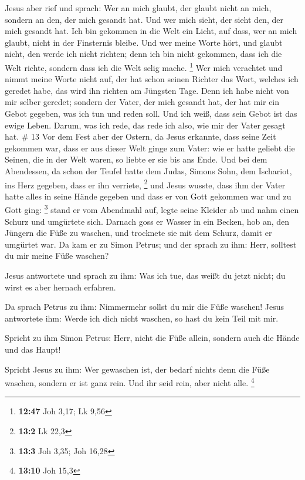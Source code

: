  Jesus aber rief und sprach: Wer an mich glaubt, der glaubt
nicht an mich, sondern an den, der mich gesandt hat.  Und
wer mich sieht, der sieht den, der mich gesandt hat.  Ich
bin gekommen in die Welt ein Licht, auf dass, wer an mich glaubt, nicht
in der Finsternis bleibe.  Und wer meine Worte hört, und
glaubt nicht, den werde ich nicht richten; denn ich bin nicht gekommen,
dass ich die Welt richte, sondern dass ich die Welt selig mache.
\footnote{\textbf{12:47} Joh 3,17; Lk 9,56}  Wer mich
verachtet und nimmt meine Worte nicht auf, der hat schon seinen Richter
das Wort, welches ich geredet habe, das wird ihn richten am Jüngsten
Tage.  Denn ich habe nicht von mir selber geredet; sondern
der Vater, der mich gesandt hat, der hat mir ein Gebot gegeben, was ich
tun und reden soll.  Und ich weiß, dass sein Gebot ist das
ewige Leben. Darum, was ich rede, das rede ich also, wie mir der Vater
gesagt hat. \# 13  Vor dem Fest aber der Ostern, da Jesus
erkannte, dass seine Zeit gekommen war, dass er aus dieser Welt ginge
zum Vater: wie er hatte geliebt die Seinen, die in der Welt waren, so
liebte er sie bis ans Ende.  Und bei dem Abendessen, da
schon der Teufel hatte dem Judas, Simons Sohn, dem Ischariot, ins Herz
gegeben, dass er ihn verriete, \footnote{\textbf{13:2} Lk 22,3}
 und Jesus wusste, dass ihm der Vater hatte alles in seine
Hände gegeben und dass er von Gott gekommen war und zu Gott ging:
\footnote{\textbf{13:3} Joh 3,35; Joh 16,28}  stand er vom
Abendmahl auf, legte seine Kleider ab und nahm einen Schurz und
umgürtete sich.  Darnach goss er Wasser in ein Becken, hob
an, den Jüngern die Füße zu waschen, und trocknete sie mit dem Schurz,
damit er umgürtet war.  Da kam er zu Simon Petrus; und der
sprach zu ihm: Herr, solltest du mir meine Füße waschen?

 Jesus antwortete und sprach zu ihm: Was ich tue, das weißt
du jetzt nicht; du wirst es aber hernach erfahren.

 Da sprach Petrus zu ihm: Nimmermehr sollst du mir die Füße
waschen! Jesus antwortete ihm: Werde ich dich nicht waschen, so hast du
kein Teil mit mir.

 Spricht zu ihm Simon Petrus: Herr, nicht die Füße allein,
sondern auch die Hände und das Haupt!

 Spricht Jesus zu ihm: Wer gewaschen ist, der bedarf nichts
denn die Füße waschen, sondern er ist ganz rein. Und ihr seid rein, aber
nicht alle. \footnote{\textbf{13:10} Joh 15,3}

